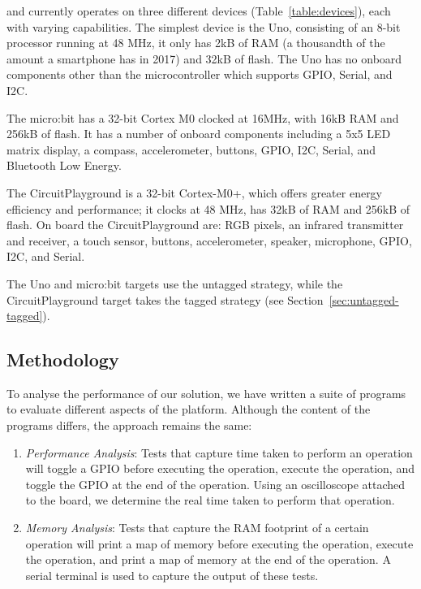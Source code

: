 \MC and \CO currently operates on three different devices (Table~\ref{table:devices}), each with varying capabilities. The simplest device is the Uno, consisting of an 8-bit processor running at 48 MHz, it only has 2kB of RAM (a thousandth of the amount a smartphone has in 2017) and 32kB of flash. The Uno has no onboard components other than the microcontroller which supports GPIO, Serial, and I2C.

The micro:bit has a 32-bit Cortex M0 clocked at 16MHz, with 16kB RAM and 256kB of flash. It has a number of onboard components including a 5x5 LED matrix display, a compass, accelerometer, buttons, GPIO, I2C, Serial, and Bluetooth Low Energy.

The CircuitPlayground is a 32-bit Cortex-M0+, which offers greater energy efficiency and performance; it clocks at 48 MHz, has 32kB of RAM and 256kB of flash. On board the CircuitPlayground are: RGB pixels, an infrared transmitter and receiver, a touch sensor, buttons, accelerometer, speaker, microphone, GPIO, I2C, and Serial.

The Uno and micro:bit \MC targets use the untagged strategy, while the CircuitPlayground target takes the tagged strategy (see Section~\ref{sec:untagged-tagged}).

\subsection{Methodology}

To analyse the performance of our solution, we have written a suite of programs to evaluate different aspects of the platform. Although the content of the programs differs, the approach remains the same:

\begin{enumerate}
    \item \textit{Performance Analysis}: Tests that capture time taken to perform an operation will toggle a GPIO before executing the operation, execute the operation, and toggle the GPIO at the end of the operation. Using an oscilloscope attached to the board, we determine the real time taken to perform that operation.

    \item \textit{Memory Analysis}: Tests that capture the RAM footprint of a certain operation will print a map of memory before executing the operation, execute the operation, and print a map of memory at the end of the operation. A serial terminal is used to capture the output of these tests.
\end{enumerate}

